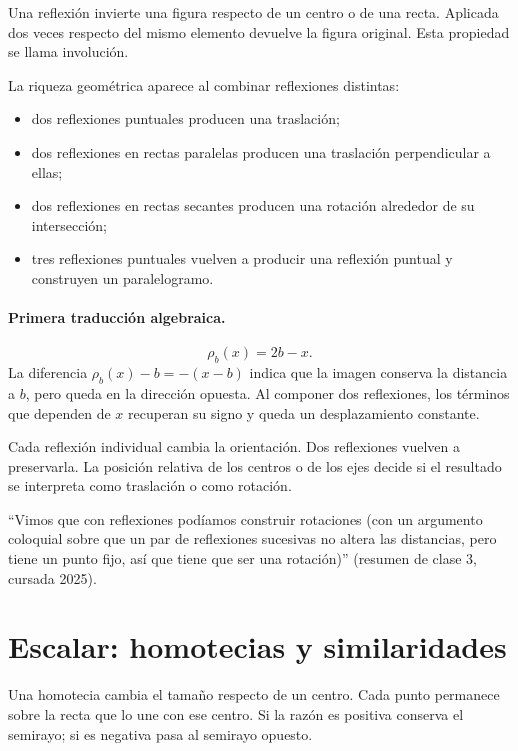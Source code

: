 Una reflexión invierte una figura respecto de un centro o de una recta. Aplicada dos veces
respecto del mismo elemento devuelve la figura original. Esta propiedad se llama involución.

La riqueza geométrica aparece al combinar reflexiones distintas:
\begin{itemize}
  \item dos reflexiones puntuales producen una traslación;
  \item dos reflexiones en rectas paralelas producen una traslación perpendicular a ellas;
  \item dos reflexiones en rectas secantes producen una rotación alrededor de su intersección;
  \item tres reflexiones puntuales vuelven a producir una reflexión puntual y construyen un
  paralelogramo.
\end{itemize}

\paragraph{Primera traducción algebraica.}
\[
  \rho_b(x)=2b-x.
\]
La diferencia \(\rho_b(x)-b=-(x-b)\) indica que la imagen conserva la distancia a \(b\),
pero queda en la dirección opuesta. Al componer dos reflexiones, los términos que dependen de
\(x\) recuperan su signo y queda un desplazamiento constante.

\begin{idea}
Cada reflexión individual cambia la orientación. Dos reflexiones vuelven a preservarla. La
posición relativa de los centros o de los ejes decide si el resultado se interpreta como
traslación o como rotación.
\end{idea}

\begin{idea}
``Vimos que con reflexiones podíamos construir rotaciones (con un argumento coloquial
sobre que un par de reflexiones sucesivas no altera las distancias, pero tiene un punto
fijo, así que tiene que ser una rotación)'' (resumen de clase 3, cursada 2025).
\end{idea}

\section{Escalar: homotecias y similaridades}\label{sec:escalar}

Una homotecia cambia el tamaño respecto de un centro. Cada punto permanece sobre la recta que
lo une con ese centro. Si la razón es positiva conserva el semirayo; si es negativa pasa al
semirayo opuesto.

